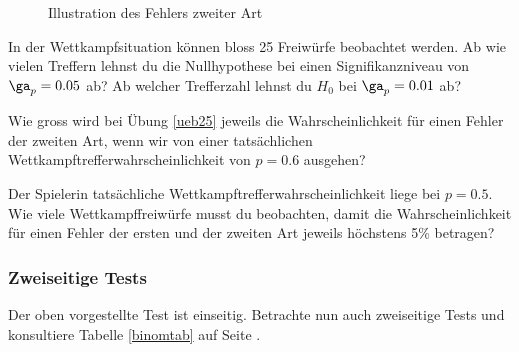 \documentclass[%
11pt,%
twoside,%
titlepage,%
german,%
headsepline%
]{scrartcl}
\begin{document}
\begin{figure}
\begin{center}
{
}
\end{center}
\caption{Illustration des Fehlers zweiter Art}
\end{figure}

\begin{ueb}[25 W\"urfe]\label{ueb25}
In der Wettkampfsituation können bloss 25 Freiwürfe beobachtet werden. Ab wie vielen Treffern lehnst du die Nullhypothese bei einen Signifikanzniveau von $\ga_p = 0.05$ ab? Ab welcher Trefferzahl lehnst du $H_0$ bei $\ga_p = 0.01$ ab?
\end{ueb}

\begin{ueb}
Wie gross wird bei Übung \ref{ueb25} jeweils die Wahrscheinlichkeit für einen Fehler der zweiten Art, wenn wir von einer tatsächlichen Wettkampftrefferwahrscheinlichkeit von $p=0.6$ ausgehen?
\end{ueb}

\begin{ueb}
Der Spielerin tatsächliche Wettkampftrefferwahrscheinlichkeit liege bei $p=0.5$. Wie viele Wettkampffreiwürfe musst du beobachten, damit die Wahrscheinlichkeit für einen Fehler der ersten und der zweiten Art jeweils höchstens 5\% betragen?
\end{ueb}

\subsubsection{Zweiseitige Tests}

Der
oben vorgestellte Test ist einseitig. Betrachte nun auch zweiseitige Tests und konsultiere Tabelle \ref{binomtab} auf Seite \pageref{binomtab}.
\end{document}
